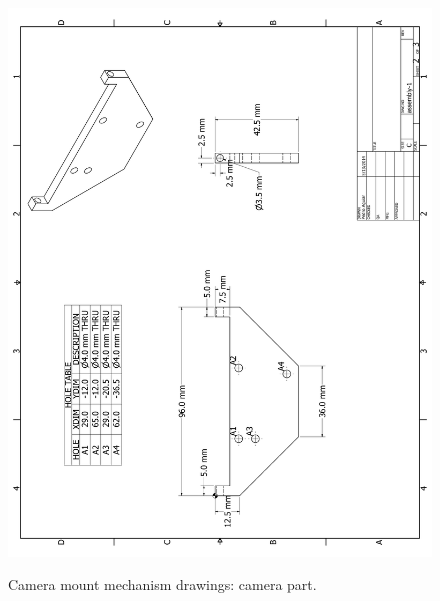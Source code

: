\begin{figure}[ht!]
\begin{center}
\includegraphics[height=1.2\textwidth]{fig/cammountp2}\\
\caption{Camera mount mechanism drawings: camera part.}
\label{fig_cammountp2}
\end{center}
\end{figure}
